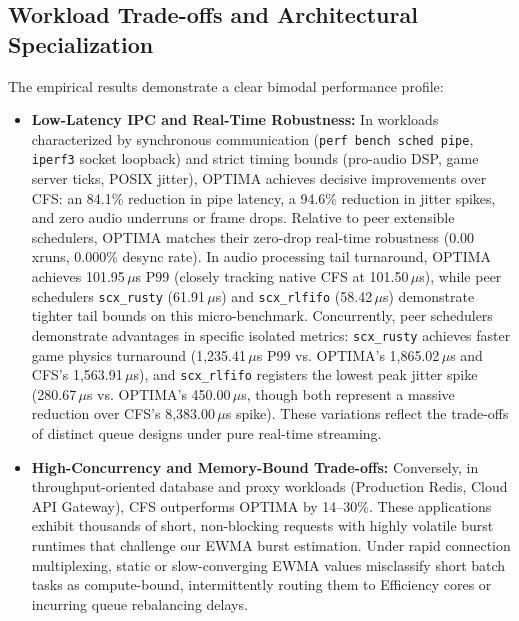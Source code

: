 \documentclass[conference]{IEEEtran}
\begin{document}
\subsection{Workload Trade-offs and Architectural Specialization}
The empirical results demonstrate a clear bimodal performance profile:
\begin{itemize}
    \item \textbf{Low-Latency IPC and Real-Time Robustness:} In workloads characterized by synchronous communication (\texttt{perf bench sched pipe}, \texttt{iperf3} socket loopback) and strict timing bounds (pro-audio DSP, game server ticks, POSIX jitter), OPTIMA achieves decisive improvements over CFS: an 84.1\% reduction in pipe latency, a 94.6\% reduction in jitter spikes, and zero audio underruns or frame drops. Relative to peer extensible schedulers, OPTIMA matches their zero-drop real-time robustness (0.00 xruns, 0.000\% desync rate). In audio processing tail turnaround, OPTIMA achieves 101.95\,$\mu$s P99 (closely tracking native CFS at 101.50\,$\mu$s), while peer schedulers \texttt{scx\_rusty} (61.91\,$\mu$s) and \texttt{scx\_rlfifo} (58.42\,$\mu$s) demonstrate tighter tail bounds on this micro-benchmark. Concurrently, peer schedulers demonstrate advantages in specific isolated metrics: \texttt{scx\_rusty} achieves faster game physics turnaround (1,235.41\,$\mu$s P99 vs. OPTIMA's 1,865.02\,$\mu$s and CFS's 1,563.91\,$\mu$s), and \texttt{scx\_rlfifo} registers the lowest peak jitter spike (280.67\,$\mu$s vs. OPTIMA's 450.00\,$\mu$s, though both represent a massive reduction over CFS's 8,383.00\,$\mu$s spike). These variations reflect the trade-offs of distinct queue designs under pure real-time streaming.
    \item \textbf{High-Concurrency and Memory-Bound Trade-offs:} Conversely, in throughput-oriented database and proxy workloads (Production Redis, Cloud API Gateway), CFS outperforms OPTIMA by 14--30\%. These applications exhibit thousands of short, non-blocking requests with highly volatile burst runtimes that challenge our EWMA burst estimation. Under rapid connection multiplexing, static or slow-converging EWMA values misclassify short batch tasks as compute-bound, intermittently routing them to Efficiency cores or incurring queue rebalancing delays.
\end{itemize}
\end{document}
